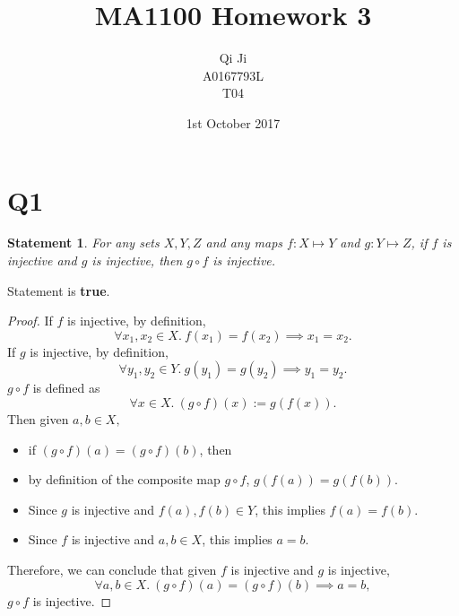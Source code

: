 \documentclass[12pt]{article}
\title{MA1100 Homework 3}
\author{Qi Ji\\
    \small A0167793L\\
    \footnotesize T04}
\date{1st October 2017}
\newtheorem*{stmt}{Statement}
\begin{document}
\maketitle

\section*{Q1}
\begin{stmt}
    For any sets $X,Y,Z$ and any maps $f:X\mapsto Y$ and $g:Y\mapsto Z$,
    if $f$ is injective and $g$ is injective, then $g\circ f$ is injective.
\end{stmt}
Statement is \textbf{true}.
\begin{proof}
    If $f$ is injective, by definition,
    $$\forall x_1,x_2 \in X.~ f(x_1) = f(x_2) \implies x_1 = x_2.$$
    If $g$ is injective, by definition,
    $$\forall y_1,y_2 \in Y.~ g(y_1) = g(y_2) \implies y_1 = y_2.$$
    $g\circ f$ is defined as
    $$\forall x \in X.~ (g\circ f)(x) := g(f(x)).$$
    Then given $a,b \in X,$
    \begin{itemize}[label={}]
        \item if $(g \circ f)(a) = (g \circ f)(b)$, then
        \item by definition of the composite map $g \circ f$, $g(f(a)) = g(f(b))$.
        \item Since $g$ is injective and $f(a), f(b) \in Y$, this implies $f(a) = f(b)$.
        \item Since $f$ is injective and $a, b \in X$, this implies $a = b$.
    \end{itemize}
    Therefore, we can conclude that given $f$ is injective and $g$ is injective,
    $$\forall a, b \in X.~ (g\circ f)(a) = (g\circ f)(b) \implies a = b,$$
    $g\circ f$ is injective.
\end{proof}
\newpage
\end{document}
